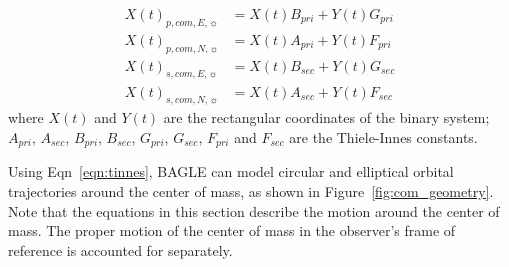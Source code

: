 \documentclass[twocolumn]{aastex701}
\newcommand{\vect}[1]{\boldsymbol{#1}}
\newcommand{\Xcomp}{\vect{X(t)}_{\boldsymbol{p},\boldsymbol{com},\sun}}
\newcommand{\Xcoms}{\vect{X(t)}_{\boldsymbol{s},\boldsymbol{com},\sun}}
\newcommand{\Xcomep}{{X(t)}_{{p, {com}, E},\sun}}
\newcommand{\Xcomnp}{{X(t)}_{{p, {com}, N},\sun}}
\newcommand{\Xcomes}{{X(t)}_{{s, {com}, E},\sun}}
\newcommand{\Xcomns}{{X(t)}_{{s, {com}, N},\sun}}
\newcommand{\Apri}{A_{pri}}
\newcommand{\Asec}{A_{sec}}
\newcommand{\Bpri}{B_{pri}}
\newcommand{\Bsec}{B_{sec}}
\newcommand{\Fpri}{F_{pri}}
\newcommand{\Fsec}{F_{sec}}
\newcommand{\Gpri}{G_{pri}}
\newcommand{\Gsec}{G_{sec}}
\begin{document}





\begin{eqnarray}
\label{eqn:tinnes}
    \Xcomep &= X(t) \Bpri + Y(t) \Gpri  \nonumber \\
    \Xcomnp &= X(t) \Apri + Y(t) \Fpri  \nonumber \\
    \Xcomes &= X(t) \Bsec + Y(t) \Gsec \nonumber \\
    \Xcomns &= X(t) \Asec + Y(t) \Fsec 
\end{eqnarray}
where $X(t)$ and $Y(t)$ are the rectangular coordinates of the binary system; $A_{pri}$, $A_{sec}$, $B_{pri}$, $B_{sec}$, $G_{pri}$, $G_{sec}$, $F_{pri}$ and $F_{sec}$ are the Thiele-Innes constants. 

Using Eqn~\ref{eqn:tinnes}, BAGLE can model circular and elliptical orbital trajectories around the center of mass, as shown in Figure~\ref{fig:com_geometry}. Note that the equations in this section describe the motion around the center of mass. The proper motion of the center of mass in the observer's frame of reference is accounted for separately. 
\end{document}
